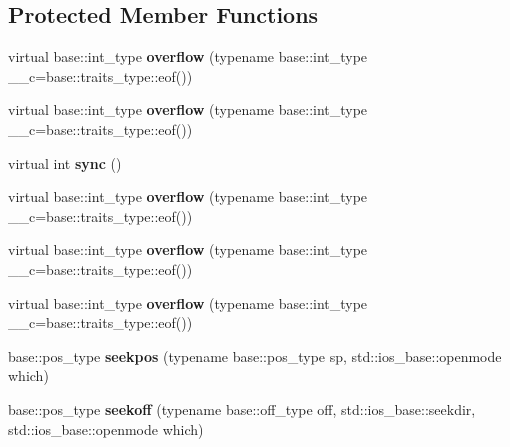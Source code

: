 \subsection*{Protected Member Functions}
\begin{DoxyCompactItemize}
\item 
\mbox{\label{structtestbuf_a1d33d01e5a3f18a1fa4407c67eb87f52}} 
virtual base\+::int\+\_\+type {\bfseries overflow} (typename base\+::int\+\_\+type \+\_\+\+\_\+c=base\+::traits\+\_\+type\+::eof())
\item 
\mbox{\label{structtestbuf_a1d33d01e5a3f18a1fa4407c67eb87f52}} 
virtual base\+::int\+\_\+type {\bfseries overflow} (typename base\+::int\+\_\+type \+\_\+\+\_\+c=base\+::traits\+\_\+type\+::eof())
\item 
\mbox{\label{structtestbuf_a0b5673fd18dc4f85aff8adbc8142ec79}} 
virtual int {\bfseries sync} ()
\item 
\mbox{\label{structtestbuf_a1d33d01e5a3f18a1fa4407c67eb87f52}} 
virtual base\+::int\+\_\+type {\bfseries overflow} (typename base\+::int\+\_\+type \+\_\+\+\_\+c=base\+::traits\+\_\+type\+::eof())
\item 
\mbox{\label{structtestbuf_a1d33d01e5a3f18a1fa4407c67eb87f52}} 
virtual base\+::int\+\_\+type {\bfseries overflow} (typename base\+::int\+\_\+type \+\_\+\+\_\+c=base\+::traits\+\_\+type\+::eof())
\item 
\mbox{\label{structtestbuf_a1d33d01e5a3f18a1fa4407c67eb87f52}} 
virtual base\+::int\+\_\+type {\bfseries overflow} (typename base\+::int\+\_\+type \+\_\+\+\_\+c=base\+::traits\+\_\+type\+::eof())
\item 
\mbox{\label{structtestbuf_aadb0268eede3e5dd19ebcb1810966950}} 
base\+::pos\+\_\+type {\bfseries seekpos} (typename base\+::pos\+\_\+type sp, std\+::ios\+\_\+base\+::openmode which)
\item 
\mbox{\label{structtestbuf_aab9d58dd2cdeeb90e9ccb54290cedaa5}} 
base\+::pos\+\_\+type {\bfseries seekoff} (typename base\+::off\+\_\+type off, std\+::ios\+\_\+base\+::seekdir, std\+::ios\+\_\+base\+::openmode which)

\end{DoxyCompactItemize}
